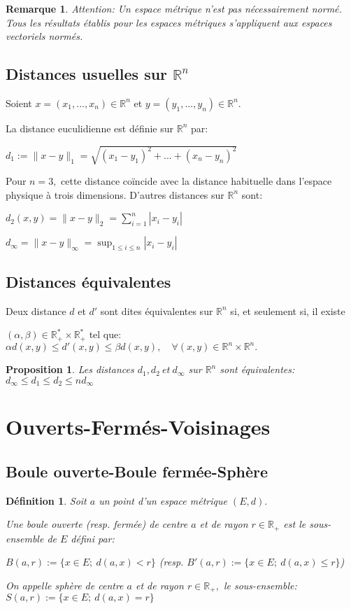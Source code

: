 \documentclass[11pt,a4paper]{report}
\newtheorem{definition}{Définition}[section]
\newtheorem{remarque}{Remarque}[section]
\newtheorem{proposition}{Proposition}[section]
\begin{document}
\begin{remarque}
Attention: Un espace métrique n'est pas nécessairement normé. Tous les résultats établis pour les espaces métriques s'appliquent aux espaces vectoriels normés.
\end{remarque}

\subsection{Distances usuelles sur $\mathbb{R}^n$}

Soient $x=(x_1,...,x_n)\in \mathbb{R}^n$ et $y=(y_1,...,y_n)\in \mathbb{R}^n.$

La distance euculidienne est définie sur $\mathbb{R}^n$ par:

$d_1:=\|x-y\|_1=\sqrt{(x_1-y_1)^2+...+(x_n-y_n)^2}$

Pour $n=3,$ cette distance coïncide avec la distance habituelle dans l'espace physique à trois dimensions. D'autres distances sur $\mathbb{R}^n$ sont:

$d_2(x,y)=\|x-y\|_2=\sum_{i=1}^{n}|x_i-y_i|$

$d_{\infty}=\|x-y\|_{\infty}=\sup_{1\leq i\leq n}|x_i-y_i|$

\subsection{Distances équivalentes}
Deux distance $d$ et $d'$ sont dites équivalentes sur $\mathbb{R}^n$ si, et seulement si, il existe

$(\alpha,\beta)\in \mathbb{R}_{+}^{*}\times\mathbb{R}_{+}^{*}$ tel que: $\alpha d(x,y)\leq d'(x,y)\leq\beta d(x,y),\quad\forall(x,y)\in \mathbb{R}^n\times \mathbb{R}^n.$

\begin{proposition}
Les distances $d_1, d_2\:et\:d_{\infty}$ sur $\mathbb{R}^n$ sont équivalentes: $d_{\infty}\leq d_1\leq d_2\leq nd_{\infty}$
\end{proposition}


\section{Ouverts-Fermés-Voisinages}
\subsection{Boule ouverte-Boule fermée-Sphère}
\begin{definition}
Soit $a$ un point d'un espace métrique $(E,d).$

Une boule ouverte (resp. fermée) de centre $a$ et de rayon $r\in \mathbb{R}_{+}$ est le sous-ensemble de $E$ défini par:

$B(a,r):=\{x\in E;\:d(a,x)< r\}$ (resp. $B'(a,r):=\{x\in E;\:d(a,x)\leq r\}$)

On appelle sphère de centre $a$ et de rayon $r\in \mathbb{R}_{+},$ le sous-ensemble: $S(a,r):=\{x\in E;\:d(a,x)=r\}$

\end{definition}
\end{document}
